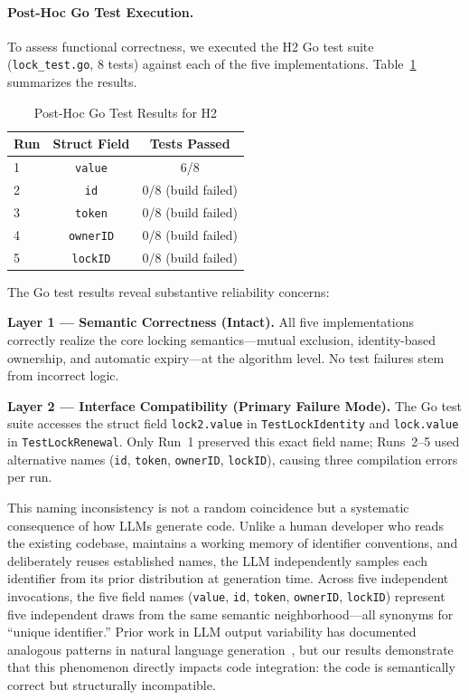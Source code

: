 \documentclass[conference]{IEEEtran}
\begin{document}
\paragraph{Post-Hoc Go Test Execution.}
To assess functional correctness, we executed the H2 Go test suite (\texttt{lock\_test.go}, 8 tests) against each of the five implementations. Table~\ref{tab:h2_go_tests} summarizes the results.

\begin{table}[h]
\centering
\caption{Post-Hoc Go Test Results for H2}
\label{tab:h2_go_tests}
\small
\begin{tabular}{@{}lcc@{}}
\toprule
\textbf{Run} & \textbf{Struct Field} & \textbf{Tests Passed}\\
\midrule
1 & \texttt{value} & 6/8 \\
2 & \texttt{id} & 0/8 (build failed) \\
3 & \texttt{token} & 0/8 (build failed) \\
4 & \texttt{ownerID} & 0/8 (build failed) \\
5 & \texttt{lockID} & 0/8 (build failed) \\
\bottomrule
\end{tabular}
\end{table}

The Go test results reveal substantive reliability concerns:

\textbf{Layer 1 --- Semantic Correctness (Intact).} All five implementations correctly realize the core locking semantics---mutual exclusion, identity-based ownership, and automatic expiry---at the algorithm level. No test failures stem from incorrect logic.

\textbf{Layer 2 --- Interface Compatibility (Primary Failure Mode).}
The Go test suite accesses the struct field \texttt{lock2.value} in \texttt{TestLockIdentity} and \texttt{lock.value} in \texttt{TestLockRenewal}. Only Run~1 preserved this exact field name; Runs~2--5 used alternative names (\texttt{id}, \texttt{token}, \texttt{ownerID}, \texttt{lockID}), causing three compilation errors per run.

This naming inconsistency is not a random coincidence but a systematic consequence of how LLMs generate code. Unlike a human developer who reads the existing codebase, maintains a working memory of identifier conventions, and deliberately reuses established names, the LLM independently samples each identifier from its prior distribution at generation time. Across five independent invocations, the five field names (\texttt{value}, \texttt{id}, \texttt{token}, \texttt{ownerID}, \texttt{lockID}) represent five independent draws from the same semantic neighborhood---all synonyms for ``unique identifier.'' Prior work in LLM output variability has documented analogous patterns in natural language generation~\cite{brown2020language}, but our results demonstrate that this phenomenon directly impacts code integration: the code is semantically correct but structurally incompatible.
\end{document}
